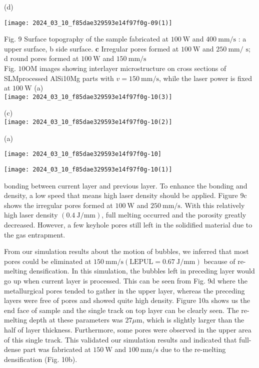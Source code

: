 \documentclass[10pt]{article}
\begin{document}
(d)

\begin{center}
\texttt{[image: 2024\_03\_10\_f85dae329593e14f97f0g-09(1)]}
\end{center}

Fig. 9 Surface topography of the sample fabricated at $100 \mathrm{~W}$ and $400 \mathrm{~mm} / \mathrm{s}$ : a upper surface, b side surface. $\mathbf{c}$ Irregular pores formed at $100 \mathrm{~W}$ and $250 \mathrm{~mm} /$ $\mathrm{s}$; d round pores formed at $100 \mathrm{~W}$ and $150 \mathrm{~mm} / \mathrm{s}$\\
Fig. $10 \mathrm{OM}$ images showing interlayer microstructure on cross sections of SLMprocessed AlSi10Mg parts with $v=150 \mathrm{~mm} / \mathrm{s}$, while the laser power is fixed at $100 \mathrm{~W}$ (a)\\
\texttt{[image: 2024\_03\_10\_f85dae329593e14f97f0g-10(3)]}

(c)\\
\texttt{[image: 2024\_03\_10\_f85dae329593e14f97f0g-10(2)]}

(a)

\begin{center}
\texttt{[image: 2024\_03\_10\_f85dae329593e14f97f0g-10]}
\end{center}

\begin{center}
\texttt{[image: 2024\_03\_10\_f85dae329593e14f97f0g-10(1)]}
\end{center}

bonding between current layer and previous layer. To enhance the bonding and density, a low speed that means high laser density should be applied. Figure $9 \mathrm{c}$ shows the irregular pores formed at $100 \mathrm{~W}$ and $250 \mathrm{~mm} / \mathrm{s}$. With this relatively high laser density $(0.4 \mathrm{~J} / \mathrm{mm})$, full melting occurred and the porosity greatly decreased. However, a few keyhole pores still left in the solidified material due to the gas entrapment.

From our simulation results about the motion of bubbles, we inferred that most pores could be eliminated at $150 \mathrm{~mm} / \mathrm{s}(\mathrm{LEPUL}=0.67 \mathrm{~J} / \mathrm{mm})$ because of re-melting densification. In this simulation, the bubbles left in preceding layer would go up when current layer is processed. This can be seen from Fig. 9d where the metallurgical pores tended to gather in the upper layer, whereas the preceding layers were free of pores and showed quite high density. Figure 10a shows us the end face of sample and the single track on top layer can be clearly seen. The re- melting depth at these parameters was $27 \mu \mathrm{m}$, which is slightly larger than the half of layer thickness. Furthermore, some pores were observed in the upper area of this single track. This validated our simulation results and indicated that full-dense part was fabricated at $150 \mathrm{~W}$ and $100 \mathrm{~mm} / \mathrm{s}$ due to the re-melting densification (Fig. 10b).
\end{document}
